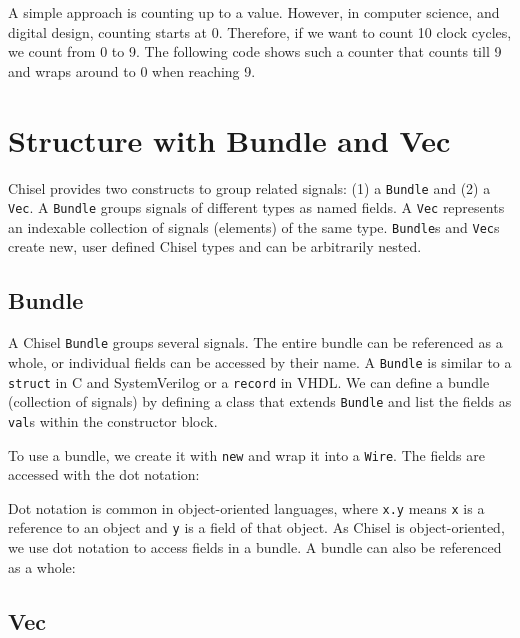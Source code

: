 \documentclass[%
    10pt,
    headinclude, footexclude,
    openright, %
    notitlepage,
    cleardoubleempty,
    headsepline,
    pointlessnumbers,
    bibtotoc, idxtotoc,
    ]{scrbook}
\newcommand{\code}[1]{{\lstinline[basicstyle=\small\ttfamily]{#1}}}
\begin{document}
A simple approach is counting up to a value. However, in computer science,
and digital design, counting starts at 0. Therefore, if we want to count
10 clock cycles, we count from 0 to 9. The following code shows such a counter that counts
till 9 and wraps around to 0 when reaching 9.


\section{Structure with Bundle and Vec}


Chisel provides two constructs to group related signals: (1) a \code{Bundle} and (2) a \code{Vec}.
A \code{Bundle} groups signals of different types as named fields.
A \code{Vec} represents an indexable collection of signals (elements) of the same type.
\code{Bundle}s and \code{Vec}s create new, user defined Chisel types and can be arbitrarily nested.

\subsection{Bundle}

A Chisel \code{Bundle} groups several signals. The entire bundle can be referenced
as a whole, or individual fields can be accessed by their name.
A \code{Bundle} is similar to a \code{struct} in C and SystemVerilog or a \code{record} in VHDL.
We can define a bundle (collection of signals) by defining a class that
extends \code{Bundle} and list the fields as \code{val}s within the constructor block.


\noindent To use a bundle, we create it with \code{new} and wrap it into a \code{Wire}.
The fields are accessed with the dot notation:


Dot notation is common in object-oriented languages, where \code{x.y} means
\code{x} is a reference to an object and \code{y} is a field of that object.
As Chisel is object-oriented, we use dot notation to access fields in a bundle.
A bundle can also be referenced as a whole:


\subsection{Vec}
\end{document}
